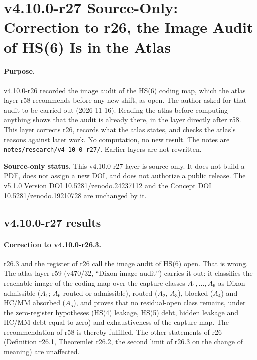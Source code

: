 
\clearpage
\section*{v4.10.0-r27 Source-Only: Correction to r26, the Image Audit of HS(6) Is in the Atlas}
\label{sec:v4100-r27-image-audit-correction}

\paragraph{Purpose.}
v4.10.0-r26 recorded the image audit of the HS(6) coding map, which the atlas layer r58 recommends before any new shift, as open.  The
author asked for that audit to be carried out (2026-11-16).  Reading the atlas before computing anything shows that the audit is already
there, in the layer directly after r58.  This layer corrects r26, records what the atlas states, and checks the atlas's reasons against later work.  No computation, no new result.  The
notes are \texttt{notes/\allowbreak research/\allowbreak v4\_10\_0\_r27/}.  Earlier layers are not rewritten.

\noindent\textbf{Source-only status.}
This v4.10.0-r27 layer is source-only.  It does not build a PDF, does not assign a new DOI,
and does not authorize a public release.  The v5.1.0 Version DOI
\href{https://doi.org/10.5281/zenodo.24237112}{10.5281/zenodo.24237112} and the Concept DOI
\href{https://doi.org/10.5281/zenodo.19210728}{10.5281/zenodo.19210728} are unchanged by it.

\subsection*{v4.10.0-r27 results}
\label{subsec:v4100-r27-results}

\paragraph{Correction to v4.10.0-r26.3.}
r26.3 and the register of r26 call the image audit of HS(6) open.  That is wrong.  The atlas layer r59 (v470/32, ``Dixon image audit'')
carries it out: it classifies the reachable image of the coding map over the capture classes \(A_1,\dots,A_6\) as Dixon-admissible (\(A_1\);
\(A_6\) routed or admissible), routed (\(A_2\), \(A_3\)), blocked (\(A_4\)) and HC/MM absorbed (\(A_5\)), and proves that no residual-open class
remains, under the zero-register hypotheses (HS(4) leakage, HS(5) debt, hidden leakage and HC/MM debt equal to zero) and exhaustiveness of
the capture map.  The recommendation of r58 is thereby fulfilled.  The other statements of r26 (Definition r26.1, Theoremlet r26.2, the
second limit of r26.3 on the change of meaning) are unaffected.

